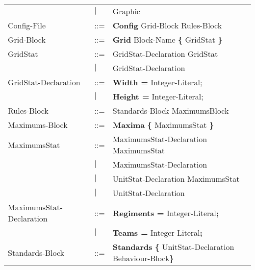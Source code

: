 \begin{center}
\begin{longtable}{l l l}
									&$\mid$	&Graphic\\
				Config-File			&	::=	&{\bf Config} Grid-Block Rules-Block\\
				Grid-Block			&	::=	&{\bf Grid} Block-Name	 {\bf \{} GridStat \bf{\}}\\
				GridStat			&	::=	&GridStat-Declaration GridStat\\
									&$\mid$	&GridStat-Declaration \\
				GridStat-Declaration		&	::=	&{\bf Width = } Integer-Literal;\\
									&$\mid$	&{\bf Height = } Integer-Literal;\\
				Rules-Block			&	::=	&Standards-Block MaximumsBlock\\
				Maximums-Block		&	::=	&{\bf Maxima} {\bf \{} MaximumsStat {\bf \}} \\
				MaximumsStat		&	::=	&MaximumsStat-Declaration MaximumsStat\\
									&$\mid$	&MaximumsStat-Declaration\\
									&$\mid$	&UnitStat-Declaration MaximumsStat\\
									&$\mid$	&UnitStat-Declaration\\
				MaximumsStat-Declaration&	::=	&{\bf Regiments = } Integer-Literal{\bf ;}\\
									&$\mid$	&{\bf Teams = } Integer-Literal{\bf ;}\\
				Standards-Block		&	::=	&{\bf Standards} {\bf \{ } UnitStat-Declaration Behaviour-Block\bf{\} }\\
				\end{longtable}
		\end{center}
		
